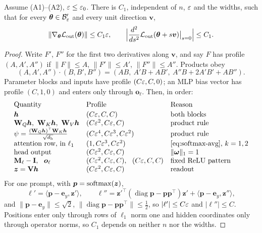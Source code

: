 \begin{lemma}
\label{lem:end-smooth}
Assume (A1)--(A2), $\varepsilon\le\varepsilon_0$. There is $C_1$, independent of $n$, $\varepsilon$ and the widths, such that for every $\bm\theta\in\mathcal B_{\varepsilon}'$ and
every unit direction $\bm v$,
\[
 \|\nabla_{\bm\theta}\mathcal L_{\mathrm{out}}(\bm\theta)\|\le C_1\varepsilon,\qquad \Bigl|\frac{d^2}{ds^2}\mathcal L_{\mathrm{out}}(\bm\theta+s\bm v)\big|_{s=0}\Bigr|\le C_1 .
\]
\end{lemma}

\begin{proof}
Write $F'$, $F''$ for the first two derivatives along $\bm v$, and say $F$ has profile $(A,A',A'')$ if $\|F\|\le A$, $\|F'\|\le A'$,
$\|F''\|\le A''$. Products obey
\[
 (A,A',A'')\cdot(B,B',B'')=(AB,\ A'B+AB',\ A''B+2A'B'+AB'').
\]
Parameter blocks and inputs have profile $(C\varepsilon,C,0)$; an MLP bias vector has profile $(C,1,0)$ and enters only through $\bm o_\ell$.
Then, in order:
\[
\begin{array}{@{}lll@{}}
 \text{Quantity} & \text{Profile} & \text{Reason}\\[2pt]
 \bm h & (C\initscale,C,C) & \text{both blocks}\\
 \mathbf W_Q\bm h,\ \mathbf W_K\bm h,\ \mathbf W_V\bm h & (C\initscale^2,C\initscale,C) & \text{product rule}\\
 \psi=\frac{(\mathbf W_Q\bm h)^\top \mathbf W_K\bm h}{\sqrt{d_{\mathrm h}}} & (C\initscale^4,C\initscale^3,C\initscale^2) & \text{product rule}\\
 \text{attention row, in }\ell_1 & (1,C\initscale^3,C\initscale^2) & \text{\cref{eq:softmax-avg}, }k=1,2\\
 \text{head output} & (C\initscale^2,C\initscale,C) & \|\bm\omega\|_1=1\\
 \mathbf M_\ell-\mathbf I,\ \ \bm o_\ell & (C\initscale^2,C\initscale,C),\ \ (C\initscale,C,C) & \text{fixed ReLU pattern}\\
 \bm z=\mathbf V\bm h & (C\initscale^2,C\initscale,C) & \text{readout}
\end{array}
\]
For one prompt, with $\bm p=\operatorname{softmax}(\bm z)$,
\[
 \ell'=\langle\bm p-\bm e_y,\bm z'\rangle,\qquad \ell''=\bm z'^\top(\operatorname{diag}\bm p-\bm p\bm p^\top)\bm z'+\langle\bm p-\bm e_y,\bm z''\rangle,
\]
and $\|\bm p-\bm e_y\|\le\sqrt2$, $\|\operatorname{diag}\bm p-\bm p\bm p^\top\|\le\frac{1}{2}$, so $|\ell'|\le C\varepsilon$ and $|\ell''|\le C$. Positions enter only through
rows of $\ell_1$ norm one and hidden coordinates only through operator norms, so $C_1$ depends on neither $n$ nor the widths.
\end{proof}

